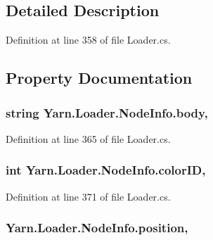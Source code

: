 \subsection{Detailed Description}


Definition at line 358 of file Loader.\-cs.



\subsection{Property Documentation}
\hypertarget{a00134_a18a8b97f2173fbcf8f3077582cc6e96e}{
\subsubsection[{body}]{\setlength{\rightskip}{0pt plus 5cm}string Yarn.\-Loader.\-Node\-Info.\-body\hspace{0.3cm}{\ttfamily [get]}, {\ttfamily [set]}}}\label{a00134_a18a8b97f2173fbcf8f3077582cc6e96e}


Definition at line 365 of file Loader.\-cs.

\hypertarget{a00134_a65f686e0170a9c50b97c4e4eedd1a093}{
\subsubsection[{color\-I\-D}]{\setlength{\rightskip}{0pt plus 5cm}int Yarn.\-Loader.\-Node\-Info.\-color\-I\-D\hspace{0.3cm}{\ttfamily [get]}, {\ttfamily [set]}}}\label{a00134_a65f686e0170a9c50b97c4e4eedd1a093}


Definition at line 371 of file Loader.\-cs.

\hypertarget{a00134_ac368ed021558af21c4abed88042c1aa8}{
\subsubsection[{position}]{ Yarn.\-Loader.\-Node\-Info.\-position\hspace{0.3cm}{\ttfamily [get]}, {\ttfamily [set]}}}\label{a00134_ac368ed021558af21c4abed88042c1aa8}


